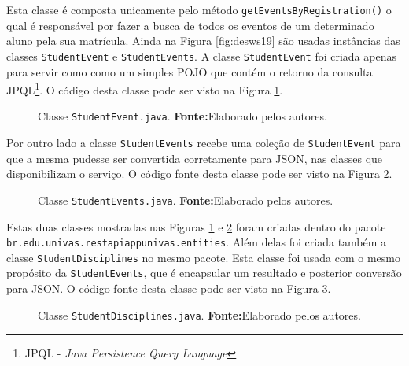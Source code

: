 	\par Esta classe é composta unicamente pelo método
\texttt{getEventsByRegistration()} o qual é responsável por fazer a busca de
todos os eventos de um determinado aluno pela sua matrícula. Ainda na Figura
\ref{fig:desws19} são usadas instâncias das classes \texttt{StudentEvent} e
\texttt{StudentEvents}. A classe \texttt{StudentEvent} foi criada apenas para
servir como como um simples POJO que contém o retorno da consulta
JPQL\footnote{JPQL - \textit{Java Persistence Query Language}}. O código desta
classe pode ser visto na Figura \ref{fig:desws20}.
	
	\begin{figure}[h!]
		
		\caption[Classe StudentEvent.java]{Classe \texttt{StudentEvent.java}.
		\textbf{Fonte:}Elaborado pelos autores.}
		\label{fig:desws20}
	\end{figure}

	\pagebreak

	\par Por outro lado a classe \texttt{StudentEvents} recebe uma coleção de
\texttt{StudentEvent} para que a mesma pudesse ser convertida corretamente para
JSON, nas classes que disponibilizam o serviço. O código fonte desta classe pode
ser visto na Figura \ref{fig:desws21}.
	
	\begin{figure}[h!]
		
		\caption[Classe StudentEvents.java]{Classe \texttt{StudentEvents.java}.
		\textbf{Fonte:}Elaborado pelos autores.}
		\label{fig:desws21}
	\end{figure}
	
	\par Estas duas classes mostradas nas Figuras \ref{fig:desws20} e 
\ref{fig:desws21} foram criadas dentro do pacote\\ 
\texttt{br.edu.univas.restapiappunivas.entities}. Além delas foi criada também
a classe \texttt{StudentDisciplines} no mesmo pacote. Esta classe foi usada com
o mesmo propósito da \texttt{StudentEvents}, que é encapsular um resultado e
posterior conversão para JSON. O código fonte desta classe pode ser visto na
Figura \ref{fig:desws22}.

	\begin{figure}[h!]
		
		\caption[Classe StudentDisciplines.java]{Classe
		\texttt{StudentDisciplines.java}.
		\textbf{Fonte:}Elaborado pelos autores.}
		\label{fig:desws22}
	\end{figure}
	
